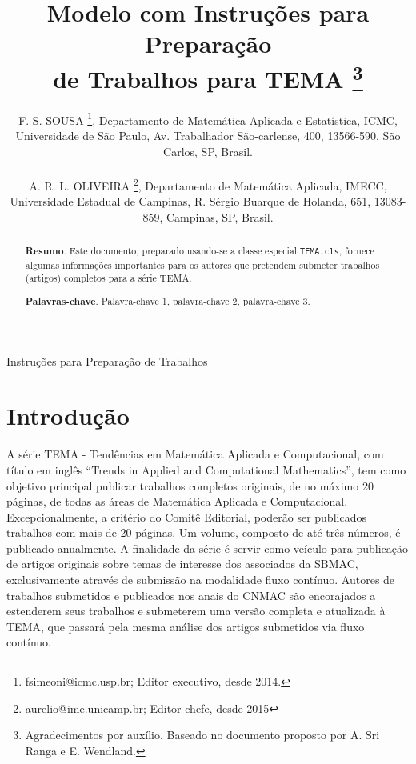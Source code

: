 \documentclass{TEMA}
\begin{document}
\title{
     Modelo com Instruções para Preparação \\ 
     de Trabalhos para TEMA%
     \thanks{Agradecimentos por auxílio. Baseado no documento
     proposto por A. Sri Ranga e E. Wendland.}
}

\author{
     F. S. SOUSA%
     \thanks{fsimeoni@icmc.usp.br; Editor executivo, desde 2014.},
     Departamento de Matemática Aplicada e Estatística,
     ICMC, Universidade de São Paulo, 
     Av. Trabalhador São-carlense, 400, 
     13566-590, São Carlos, SP, Brasil.
     \\ \\
     A. R. L. OLIVEIRA%
     \thanks{aurelio@ime.unicamp.br; Editor chefe, desde 2015},
     Departamento de Matemática Aplicada,
     IMECC, Universidade Estadual de Campinas,
     R. Sérgio Buarque de Holanda, 651, 
     13083-859, Campinas, SP, Brasil. 
}

\criartitulo

%
{Instruções para Preparação de Trabalhos}

\begin{abstract}

{\bf Resumo}. Este documento, preparado usando-se a classe
especial \texttt{TEMA.cls}, fornece algumas informações 
importantes para os autores que pretendem submeter 
trabalhos (artigos) completos para a série TEMA.

{\bf Palavras-chave}. Palavra-chave 1, palavra-chave 2,
palavra-chave 3.

\end{abstract}


\section{Introdução}

    A série TEMA - Tendências em Matemática
Aplicada e Computacional, com título em inglês ``Trends in Applied
and Computational Mathematics'',  tem como objetivo principal
publicar traba\-lhos completos originais, de no máximo 20 páginas,
de todas as áreas de Matemática Aplicada e Computacional.
Excepcionalmente, a critério do Comitê Editorial, poderão ser
publicados trabalhos com mais de 20 páginas.  Um volume, composto
de até três números, é publicado anualmente. A finalidade 
da série é servir como veículo para publicação de artigos originais 
sobre temas de interesse dos associados da SBMAC, exclusivamente
através de submissão na modalidade fluxo contínuo. Autores de
trabalhos submetidos e publicados nos anais do CNMAC são encorajados
a estenderem seus trabalhos e submeterem uma versão completa 
e atualizada à TEMA, que passará pela mesma análise dos 
artigos submetidos via fluxo contínuo. 
\end{document}
